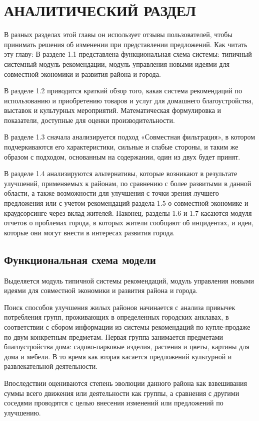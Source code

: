 \chapter{АНАЛИТИЧЕСКИЙ РАЗДЕЛ}
В разных разделах этой главы он использует отзывы пользователей, чтобы принимать решения об изменении при представлении предложений. Как читать эту главу: В разделе 1.1 представлена функциональная схема системы: типичный системный модуль рекомендации, модуль управления новыми идеями для совместной экономики и развития района и города.

В разделе 1.2 приводится краткий обзор того, какая система рекомендаций по использованию и приобретению товаров и услуг для домашнего благоустройства, выставок и культурных мероприятий. Математическая формулировка и показатели, доступные для оценки производительности.

В разделе 1.3 сначала анализируется подход «Совместная фильтрация», в котором подчеркиваются его характеристики, сильные и слабые стороны, и таким же образом с подходом, основанным на содержании, один из двух будет принят.

В разделе 1.4 анализируются альтернативы, которые возникают в результате улучшений, применяемых к районам, по сравнению с более развитыми в данной области, а также возможности для улучшения с точки зрения лучшего предложения или с учетом рекомендаций раздела 1.5 о совместной экономике и краудсорсинге через вклад жителей. Наконец, разделы 1.6 и 1.7 касаются модуля отчетов о проблемах города, в которых жители сообщают об инцидентах, и идеи, которые они могут внести в интересах развития города.


\section{Функциональная схема модели}
Выделяется модуль типичной системы рекомендаций, модуль управления новыми идеями для совместной экономики и развития района и города.

Поиск способов улучшения жилых районов начинается с анализа привычек потребления групп, проживающих в определенных городских анклавах, в соответствии с сбором информации из системы рекомендаций по купле-продаже по двум конкретным предметам. Первая группа занимается предметами благоустройства дома: садово-парковые изделия, растения и цветы, картины для дома и мебели. В то время как вторая касается предложений культурной и развлекательной деятельности.

Впоследствии оцениваются степень эволюции данного района как взвешивания суммы всего движения или деятельности как группы, а сравнения с другими соседями проводятся с целью внесения изменений или предложений по улучшению.

